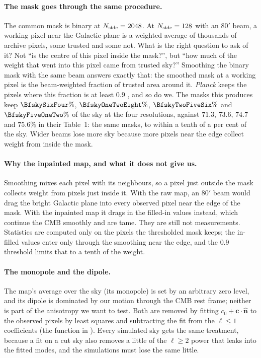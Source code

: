 \paragraph{The mask goes through the same procedure.} The common mask is binary at $N_{\rm side}=2048$. At
$N_{\rm side}=128$ with an $80'$ beam, a working pixel near the Galactic plane is a weighted average of thousands of
archive pixels, some trusted and some not. What is the right question to ask of it? Not ``is the centre of this
pixel inside the mask?'', but ``how much of the weight that went into this pixel came from trusted sky?''
Smoothing the binary mask with the same beam answers exactly that: the smoothed mask at a working pixel is the
beam-weighted fraction of trusted area around it. \textit{Planck} keeps the pixels where this fraction is at
least $0.9$ \cite{Planck2018VII}, and so do we. The masks this produces keep $\BfskySixFour\%$, $\BfskyOneTwoEight\%$,
$\BfskyTwoFiveSix\%$ and $\BfskyFiveOneTwo\%$ of the sky at the four resolutions, against $71.3$, $73.6$, $74.7$
and $75.6\%$ in their Table~1: the same masks, to within a tenth of a per cent of the sky. Wider beams lose more sky because
more pixels near the edge collect weight from inside the mask.

\paragraph{Why the inpainted map, and what it does not give us.} Smoothing mixes each pixel with its
neighbours, so a pixel just outside the mask collects weight from pixels just inside it. With the raw map, an $80'$
beam would drag the bright Galactic plane into every observed pixel near the edge of the mask. With the inpainted
map it drags in the filled-in values instead, which continue the CMB smoothly and are tame. They are still not
measurements. Statistics are computed only on the pixels the thresholded mask keeps; the in-filled values enter
only through the smoothing near the edge, and the $0.9$ threshold limits that to a tenth of the weight.

\paragraph{The monopole and the dipole.} The map's average over the sky (its monopole) is set by an arbitrary
zero level, and its dipole is dominated by our motion through the CMB rest frame; neither is part of the
anisotropy we want to test. Both are removed by fitting $c_0+\bm c\cdot\hat{\bm n}$ to the observed pixels by
least squares and subtracting the fit from the $\ell\le1$ coefficients (the function 
in ). Every simulated sky gets the same treatment, because a fit on a cut sky
also removes a little of the $\ell\ge2$ power that leaks into the fitted modes, and the simulations must lose the
same little.

